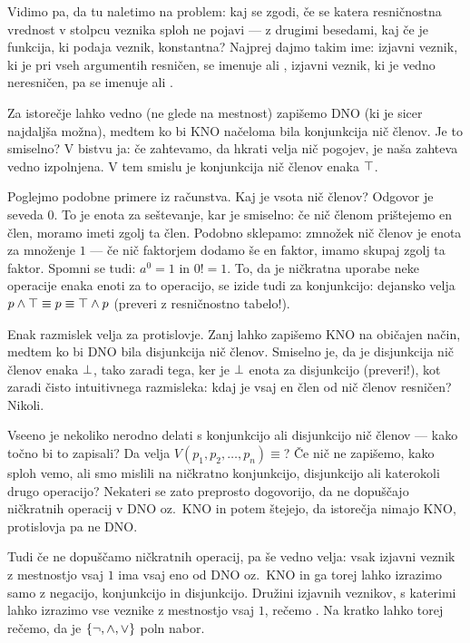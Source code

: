 		Vidimo pa, da tu naletimo na problem: kaj se zgodi, če se katera resničnostna vrednost v stolpcu veznika sploh ne pojavi --- z drugimi besedami, kaj če je funkcija, ki podaja veznik, konstantna? Najprej dajmo takim ime: izjavni veznik, ki je pri vseh argumentih resničen, se imenuje  ali , izjavni veznik, ki je vedno neresničen, pa se imenuje  ali .
		
		Za istorečje lahko vedno (ne glede na mestnost) zapišemo DNO (ki je sicer najdaljša možna), medtem ko bi KNO načeloma bila konjunkcija nič členov. Je to smiselno? V bistvu ja: če zahtevamo, da hkrati velja nič pogojev, je naša zahteva vedno izpolnjena. V tem smislu je konjunkcija nič členov enaka $\top$.
		
		Poglejmo podobne primere iz računstva. Kaj je vsota nič členov? Odgovor je seveda $0$. To je enota za seštevanje, kar je smiselno: če nič členom prištejemo en člen, moramo imeti zgolj ta člen. Podobno sklepamo: zmnožek nič členov je enota za množenje $1$ --- če nič faktorjem dodamo še en faktor, imamo skupaj zgolj ta faktor. Spomni se tudi: $a^0 = 1$ in $0! = 1$. To, da je ničkratna uporabe neke operacije enaka enoti za to operacijo, se izide tudi za konjunkcijo: dejansko velja $p \land \top \equiv p \equiv \top \land p$ (preveri z resničnostno tabelo!).
		
		Enak razmislek velja za protislovje. Zanj lahko zapišemo KNO na običajen način, medtem ko bi DNO bila disjunkcija nič členov. Smiselno je, da je disjunkcija nič členov enaka $\bot$, tako zaradi tega, ker je $\bot$ enota za disjunkcijo (preveri!), kot zaradi čisto intuitivnega razmisleka: kdaj je vsaj en člen od nič členov resničen? Nikoli.
		
		Vseeno je nekoliko nerodno delati s konjunkcijo ali disjunkcijo nič členov --- kako točno bi to zapisali? Da velja $V(p_1, p_2, \ldots, p_n) \equiv $? Če nič ne zapišemo, kako sploh vemo, ali smo mislili na ničkratno konjunkcijo, disjunkcijo ali katerokoli drugo operacijo? Nekateri se zato preprosto dogovorijo, da ne dopuščajo ničkratnih operacij v DNO oz.~KNO in potem štejejo, da istorečja nimajo KNO, protislovja pa ne DNO.
		
		Tudi če ne dopuščamo ničkratnih operacij, pa še vedno velja: vsak izjavni veznik z mestnostjo vsaj $1$ ima vsaj eno od DNO oz.~KNO in ga torej lahko izrazimo samo z negacijo, konjunkcijo in disjunkcijo. Družini izjavnih veznikov, s katerimi lahko izrazimo vse veznike z mestnostjo vsaj $1$, rečemo . Na kratko lahko torej rečemo, da je $\set{\lnot, \land, \lor}$ poln nabor.
		
